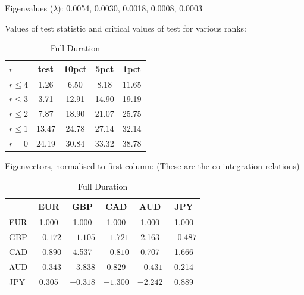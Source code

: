 	\begin{table}[!ht]
	\caption{Full Duration \label{tab:fulldur}}
	\centering
	Eigenvalues ($\lambda$): 0.0054, 0.0030, 0.0018, 0.0008, 0.0003

	Values of test statistic and critical values of test for various ranks: \\[0.1cm]
	
	\begin{tabular}{| l | c | c | c | c |} \hline
	$r$  & test & 10pct & 5pct  & 1pct \\ \hline
	$r \leq 4$ &  1.26 & 6.50 & 8.18 & 11.65 \\ \hline
	$r \leq 3$ &  3.71 & 12.91 & 14.90 & 19.19\\ \hline
	$r \leq 2$ &  7.87 & 18.90 & 21.07 & 25.75\\ \hline
	$r \leq 1$ & 13.47 & 24.78 & 27.14 & 32.14\\ \hline
	$r=0$  & 24.19 & 30.84 & 33.32 & 38.78
	\end{tabular}
	
	Eigenvectors, normalised to first column: (These are the co-integration relations) \\[0.1cm]
	
	\begin{tabular}{| l | c | c | c | c | c |} \hline
	          & EUR &   GBP  &   CAD  &   AUD   &  JPY \\ \hline
	EUR & 1.000 & 1.000 & 1.000 & 1.000 & 1.000 \\ \hline
	GBP & $-0.172$ & $-1.105$ & $-1.721$ &  2.163 & $-0.487$ \\ \hline
	CAD & $-0.890$ &  4.537 & $-0.810$ &  0.707 &  1.666 \\ \hline
	AUD & $-0.343$ & $-3.838$ &  0.829 & $-0.431$ &  0.214 \\ \hline
	JPY &  0.305 & $-0.318$ & $-1.300$ & $-2.242$ & 0.889
	\end{tabular}
	\end{table}
	
